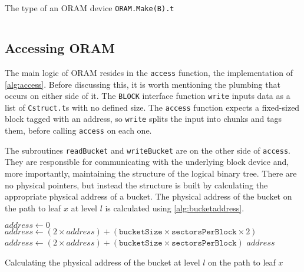 \documentclass[12pt,a4paper,twoside,openright]{report}
\begin{document}
\begin{listing}[t]
\caption{The type of an ORAM device \texttt{ORAM.Make(B).t}}
\label{lst:orammaketype}
\inputminted[fontsize=\scriptsize,firstline=87, lastline=118]{ocaml}{../mirage-oram/lib/oram.ml}
\end{listing}

\subsection{Accessing ORAM}

The main logic of ORAM resides in the \texttt{access} function, the implementation of \cref{alg:access}. Before discussing this, it is worth mentioning the plumbing that occurs on either side of it. The \texttt{BLOCK} interface function \texttt{write} inputs data as a list of \texttt{Cstruct.t}s with no defined size. The \texttt{access} function expects a fixed-sized block tagged with an address, so \texttt{write} splits the input into chunks and tags them, before calling \texttt{access} on each one.

The subroutines \texttt{readBucket} and \texttt{writeBucket} are on the other side of \texttt{access}. They are responsible for communicating with the underlying block device and, more importantly, maintaining the structure of the logical binary tree. There are no physical pointers, but instead the structure is built by calculating the appropriate physical address of a bucket. The physical address of the bucket on the path to leaf $x$ at level $l$ is calculated using \cref{alg:bucketaddress}.

\begin{algorithm}[t]
  \footnotesize
  \begin{algorithmic}
  \vskip 10pt
      \State $address \gets 0$
          \State $address \gets (2 \times address) + (\mathtt{bucketSize} \times \mathtt{sectorsPerBlock} \times 2)$
        \Else
          \State $address \gets (2 \times address) + (\mathtt{bucketSize} \times \mathtt{sectorsPerBlock})$
        \EndIf
      \EndFor
      \State \Return $address$
    \EndFunction
  \vskip 10pt
  \end{algorithmic}
  \caption{Calculating the physical address of the bucket at level $l$ on the path to leaf $x$}
  \label{alg:bucketaddress}
\end{algorithm}
\end{document}
